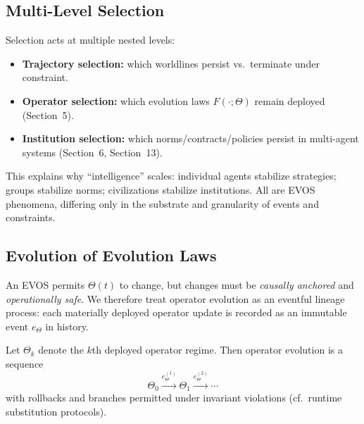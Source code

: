 \documentclass[11pt]{article}
\begin{document}
\subsection{Multi-Level Selection}
\label{sec:multilevel-selection}

Selection acts at multiple nested levels:

\begin{itemize}
  \item \textbf{Trajectory selection:} which worldlines persist vs.\ terminate under constraint.
  \item \textbf{Operator selection:} which evolution laws $F(\cdot;\Theta)$ remain deployed (Section~5).
  \item \textbf{Institution selection:} which norms/contracts/policies persist in multi-agent systems (Section~6, Section~13).
\end{itemize}

This explains why ``intelligence'' scales: individual agents stabilize strategies; groups stabilize
norms; civilizations stabilize institutions. All are EVOS phenomena, differing only in the substrate
and granularity of events and constraints.

\subsection{Evolution of Evolution Laws}
\label{sec:evolution-of-operators}

An EVOS permits $\Theta(t)$ to change, but changes must be \emph{causally anchored} and
\emph{operationally safe}. We therefore treat operator evolution as an eventful lineage process:
each materially deployed operator update is recorded as an immutable event $e_\Theta$ in history.

Let $\Theta_k$ denote the $k$th deployed operator regime. Then operator evolution is a sequence
\[
\Theta_0 \xrightarrow{e_\Theta^{(1)}} \Theta_1 \xrightarrow{e_\Theta^{(2)}} \cdots
\]
with rollbacks and branches permitted under invariant violations (cf.\ runtime substitution protocols).
\end{document}
